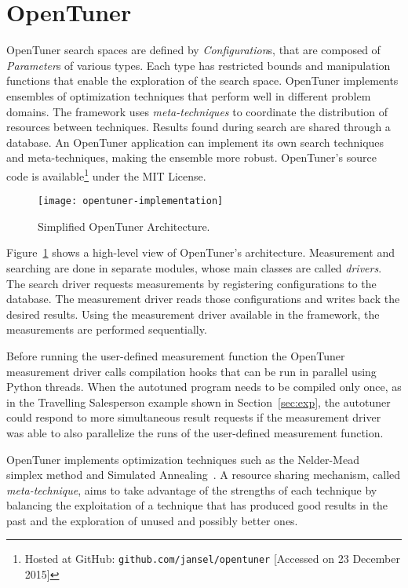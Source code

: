 \section{OpenTuner} \label{sec:ot}

OpenTuner search spaces are defined by \emph{Configuration}s, that are composed
of \emph{Parameter}s of various types. Each type has restricted bounds and
manipulation functions that enable the exploration of the search space.
OpenTuner implements ensembles of optimization techniques that
perform well in different problem domains. The framework uses
\emph{meta-techniques} to coordinate the distribution of resources
between techniques.
Results found during search are shared through a
database. An OpenTuner application can implement its own search
techniques and meta-techniques, making the ensemble more robust.
OpenTuner's source code is available\footnote{Hosted at GitHub:
\texttt{\scriptsize github.com/jansel/opentuner} [Accessed on 23 December 2015]} under the MIT License.

\begin{figure}[htpb]
    \centering
    \texttt{[image: opentuner-implementation]}
    \caption{Simplified OpenTuner Architecture.}
    \label{fig:ot-imp}
\end{figure}

Figure~\ref{fig:ot-imp} shows a high-level view of OpenTuner's architecture.
Measurement and searching are done in separate modules, whose main classes are
called \emph{drivers}. The search driver requests measurements by registering
configurations to the database. The measurement driver reads those
configurations and writes back the desired results. Using the measurement
driver available in the framework, the measurements are performed sequentially.

Before running the user-defined measurement function the OpenTuner measurement
driver calls compilation hooks that can be run in parallel using Python
threads. When the autotuned program needs to be compiled only once, as in the
Travelling Salesperson example shown in Section~\ref{sec:exp}, the autotuner
could respond to more simultaneous result requests if the measurement driver
was able to also parallelize the runs of the user-defined measurement function.

OpenTuner implements optimization techniques such as the
Nelder-Mead~\cite{nelder1965simplex} simplex method and Simulated
Annealing~\cite{kirkpatrick1983optimization}. A resource sharing mechanism,
called \emph{meta-technique}, aims to take advantage of the strengths of each
technique by balancing the exploitation of a technique that has produced good
results in the past and the exploration of unused and possibly better ones.
